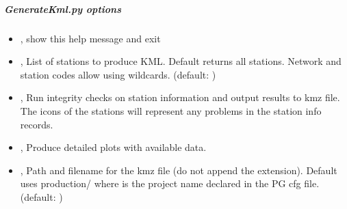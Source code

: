 \documentclass[letterpaper,10pt,english]{sphinxmanual}
\begin{document}
\subparagraph{GenerateKml.py options}
\label{\detokenize{pgamit.com:GenerateKml.py-options}}\begin{itemize}
\item {} 
\sphinxAtStartPar
{\hyperref[\detokenize{pgamit.com:GenerateKml.py--h}]{}}, {\hyperref[\detokenize{pgamit.com:GenerateKml.py---help}]{}} \sphinxhyphen{} show this help message and exit

\item {} 
\sphinxAtStartPar
{\hyperref[\detokenize{pgamit.com:GenerateKml.py--stn}]{}} , {\hyperref[\detokenize{pgamit.com:GenerateKml.py---station_list}]{}}  \sphinxhyphen{} List of stations to produce KML. Default returns all stations. Network and station codes allow using wildcards. (default: \sphinxcode{\sphinxupquote{{[}{]}}})

\item {} 
\sphinxAtStartPar
{\hyperref[\detokenize{pgamit.com:GenerateKml.py--stninfo}]{}}, {\hyperref[\detokenize{pgamit.com:GenerateKml.py---station_info}]{}} \sphinxhyphen{} Run integrity checks on station information and output results to kmz file. The icons of the stations will represent any problems in the station info records.

\item {} 
\sphinxAtStartPar
{\hyperref[\detokenize{pgamit.com:GenerateKml.py--data}]{}}, {\hyperref[\detokenize{pgamit.com:GenerateKml.py---available_data}]{}} \sphinxhyphen{} Produce detailed plots with available data.

\item {} 
\sphinxAtStartPar
{\hyperref[\detokenize{pgamit.com:GenerateKml.py--kmz}]{}} , {\hyperref[\detokenize{pgamit.com:GenerateKml.py---kmz_filename}]{}}  \sphinxhyphen{} Path and filename for the kmz file (do not append the extension). Default uses production/ where  is the project name declared in the PG cfg file. (default: )


\end{itemize}
\end{document}
